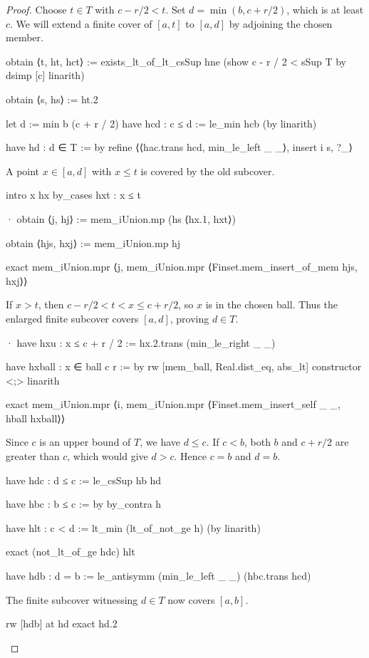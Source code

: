 \begin{proof}
  Choose $t\in T$ with $c-r/2<t$.
  Set $d=\min(b,c+r/2)$, which is at least $c$.
  We will extend a finite cover of $[a,t]$ to $[a,d]$ by adjoining the chosen member.

  \begin{lean}
    obtain ⟨t, ht, hct⟩ := exists_lt_of_lt_csSup hne (show c - r / 2 < sSup T by
      dsimp [c]
      linarith)

    obtain ⟨s, hs⟩ := ht.2

    let d := min b (c + r / 2)
    have hcd : c ≤ d := le_min hcb (by linarith)

    have hd : d ∈ T := by
      refine ⟨⟨hac.trans hcd, min_le_left _ _⟩, insert i s, ?_⟩
  \end{lean}

  A point $x\in[a,d]$ with $x\leq t$ is covered by the old subcover.

  \begin{lean}
    intro x hx
    by_cases hxt : x ≤ t

    · obtain ⟨j, hj⟩ := mem_iUnion.mp (hs ⟨hx.1, hxt⟩)

      obtain ⟨hjs, hxj⟩ := mem_iUnion.mp hj

      exact mem_iUnion.mpr ⟨j, mem_iUnion.mpr ⟨Finset.mem_insert_of_mem hjs, hxj⟩⟩
  \end{lean}

  If $x>t$, then $c-r/2<t<x\leq c+r/2$, so $x$ is in the chosen ball.
  Thus the enlarged finite subcover covers $[a,d]$, proving $d\in T$.

  \begin{lean}
    · have hxu : x ≤ c + r / 2 := hx.2.trans (min_le_right _ _)

      have hxball : x ∈ ball c r := by
        rw [mem_ball, Real.dist_eq, abs_lt]
        constructor <;> linarith

      exact mem_iUnion.mpr ⟨i, mem_iUnion.mpr ⟨Finset.mem_insert_self _ _, hball hxball⟩⟩
  \end{lean}

  Since $c$ is an upper bound of $T$, we have $d\leq c$.
  If $c<b$, both $b$ and $c+r/2$ are greater than $c$, which would give $d>c$.
  Hence $c=b$ and $d=b$.

  \begin{lean}
    have hdc : d ≤ c := le_csSup hb hd

    have hbc : b ≤ c := by
      by_contra h

      have hlt : c < d := lt_min (lt_of_not_ge h) (by linarith)

      exact (not_lt_of_ge hdc) hlt

    have hdb : d = b := le_antisymm (min_le_left _ _) (hbc.trans hcd)
  \end{lean}

  The finite subcover witnessing $d\in T$ now covers $[a,b]$.

  \begin{lean}
    rw [hdb] at hd
    exact hd.2
  \end{lean}

\end{proof}


